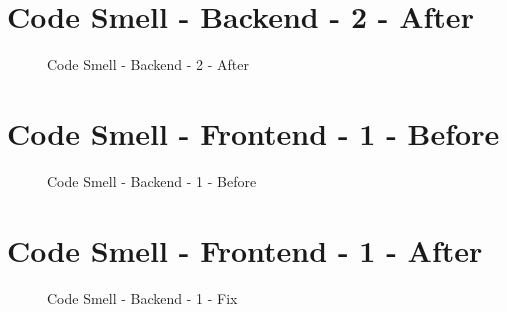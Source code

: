 \section{Code Smell - Backend - 2 - After} \label{a.4.backend.codesmell2.after}
\begin{figure}[h]
	\centering
	\caption{Code Smell - Backend - 2 - After}
	\label{a.1.aggregate}
\end{figure}

\newpage

\section{Code Smell - Frontend - 1 - Before} \label{a.4.frontend.codesmell1.before}
\begin{figure}[h]
	\centering
	\caption{Code Smell - Backend - 1 - Before}
	\label{a.1.aggregate}
\end{figure}

\section{Code Smell - Frontend - 1 - After} \label{a.4.frontend.codesmell1.after}
\begin{figure}[h]
	\centering
	\caption{Code Smell - Backend - 1 - Fix}
	\label{a.1.aggregate}
\end{figure}

\newpage
